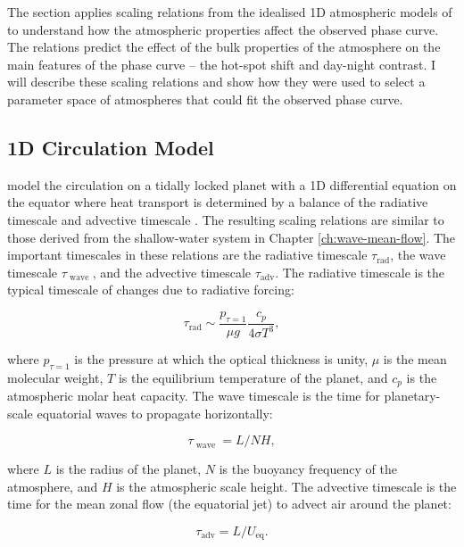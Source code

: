The section applies scaling relations from the idealised 1D atmospheric models of \citet{zhang2017dynamics} to understand how the atmospheric properties affect the observed phase curve. The relations predict the effect of the bulk properties of the atmosphere on the main features of the phase curve -- the hot-spot shift and day-night contrast. I will describe these scaling relations and show how they were used to select a parameter space of atmospheres that could fit the observed phase curve.

\subsection{1D Circulation Model}\label{sec:zhang-model}

\citet{zhang2017dynamics} model the circulation on a tidally locked planet with a 1D differential equation on the equator where heat transport is determined by a balance of the radiative timescale and advective timescale \citep{komacek2016daynightI}. The resulting scaling relations are similar to those derived from the shallow-water system in Chapter \ref{ch:wave-mean-flow}. The important timescales in these relations are the radiative timescale $\tau_{\mathrm{rad}}$, the wave timescale $\tau_{\text { wave }}$, and the advective timescale $\tau_{\mathrm{adv}}$. The radiative timescale is the typical timescale of changes due to radiative forcing:

\begin{equation}
  \tau_{\mathrm{rad}} \sim \frac{p_{\tau=1}}{\mu g} \frac{c_{p}}{4 \sigma T^{3}},
\end{equation}

where $p_{\tau=1}$ is the pressure at which the optical thickness is unity, $\mu$ is the mean molecular weight, $T$ is the equilibrium temperature of the planet, and $c_{p}$ is the atmospheric molar heat capacity. The wave timescale is the time for planetary-scale equatorial waves to propagate horizontally:

\begin{equation}
  \tau_{\text { wave }}=L / N H,
\end{equation}

where $L$ is the radius of the planet, $N$ is the buoyancy frequency of the atmosphere, and $H$ is the atmospheric scale height. The advective timescale is the time for the mean zonal flow (the equatorial jet) to advect air around the planet:

\begin{equation}
  \tau_{\mathrm{adv}}=L / U_{\mathrm{eq}}.
\end{equation}

